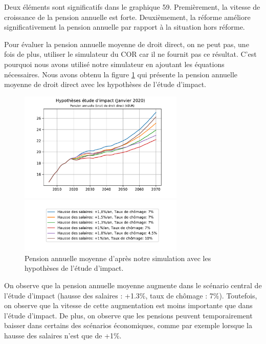 \documentclass[10pt]{article}
\begin{document}
Deux éléments sont significatifs dans le graphique 59. 
Premièrement, la vitesse de croissance de la pension annuelle est forte. 
Deuxièmement, la réforme améliore significativement la pension annuelle 
par rapport à la situation hors réforme. 

Pour évaluer la pension annuelle moyenne de droit direct, on ne peut pas, 
une fois de plus, utiliser le simulateur du COR car
il ne fournit pas ce résultat.
C'est pourquoi nous avons utilisé notre simulateur en ajoutant les équations 
nécessaires. 
Nous avons obtenu la figure \ref{fig-pension-annuelle-simulation} qui présente 
la pension annuelle moyenne de droit direct avec les hypothèses de l'étude d'impact. 

\begin{figure}
\begin{center}
\includegraphics[width=0.7\textwidth]{Simulation-pension-annuelle-moyenne.pdf}

\includegraphics[width=0.7\textwidth]{Simulation-legende.pdf}
\end{center}

\caption{Pension annuelle moyenne d'après notre simulation 
avec les hypothèses de l'étude d'impact.}
\label{fig-pension-annuelle-simulation}
\end{figure}

On observe que la pension annuelle moyenne augmente dans le scénario central de 
l'étude d'impact (hausse des salaires : +1.3\%, taux de chômage : 7\%). 
Toutefois, on observe que la vitesse de cette augmentation est moins importante 
que dans l'étude d'impact. 
De plus, on observe que les pensions peuvent temporairement baisser dans certains 
des scénarios économiques, comme par exemple lorsque la hausse des salaires n'est que 
de +1\%. 
\end{document}

